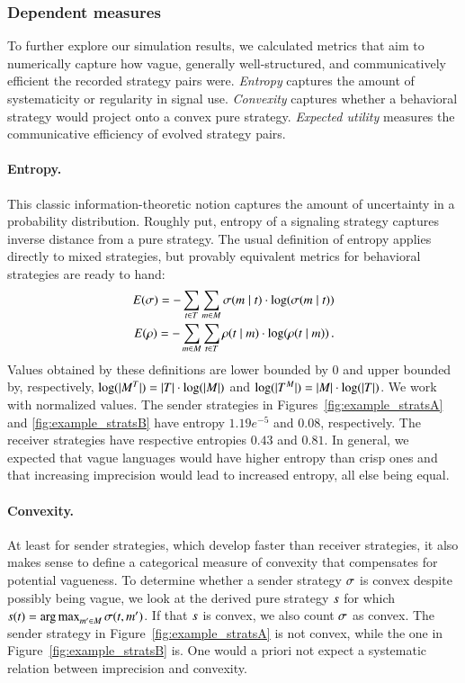 \documentclass[fleqn,reqno,10pt]{article}
\begin{document}
\subsubsection{Dependent measures}
 
To further explore our simulation results, we calculated metrics that
aim to numerically capture how vague, generally well-structured, and
communicatively efficient the recorded strategy pairs
were. \emph{Entropy} captures the amount of systematicity or
regularity in signal use. \emph{Convexity} captures whether a
behavioral strategy would project onto a convex pure
strategy. \emph{Expected utility} measures the communicative
efficiency of evolved strategy pairs.

\paragraph{Entropy.} This classic information-theoretic notion
captures the amount of uncertainty in a probability
distribution. Roughly put, entropy of a signaling strategy captures
inverse distance from a pure strategy. The usual definition of entropy
applies directly to mixed strategies, but provably equivalent metrics
for behavioral strategies are ready to hand:
\begin{align*}
  E(\sigma) = -\sum_{t \in T} \sum_{m \in M}
  \sigma(m \mid t) \cdot \log(\sigma(m \mid
  t)) \\
  E(\rho) = -\sum_{m \in M} \sum_{t \in T}
  \rho(t \mid m) \cdot \log(\rho(t \mid
  m)) \,. 
\end{align*}
Values obtained by these definitions are lower bounded by $0$ and
upper bounded by, respectively, $\log(|M^T|) = |T|
\cdot \log(|M|)$ and $\log(|T^M|) = |M| \cdot
\log(|T|)$. We work with normalized values. The sender
strategies in Figures~\ref{fig:example_stratsA} and
\ref{fig:example_stratsB} have entropy $1.19e^{-5}$ and $0.08$,
respectively. The receiver strategies have respective entropies $0.43$
and $0.81$. In general, we expected that vague languages would have
higher entropy than crisp ones and that increasing imprecision would
lead to increased entropy, all else being equal.

\paragraph{Convexity.} At least for sender strategies, which develop
faster than receiver strategies, it also makes sense to define a
categorical measure of convexity that compensates for potential
vagueness. To determine whether a sender strategy $\sigma$ is convex
despite possibly being vague, we look at the derived pure strategy
$s$ for which $s(t) = \operatorname*{arg\,max}_{m' \in M}
\sigma(t,m')$. If that $s$ is convex, we also count
$\sigma$ as convex. The sender strategy in
Figure~\ref{fig:example_stratsA} is not convex, while the one in
Figure~\ref{fig:example_stratsB} is.  One would a priori not expect a
systematic relation between imprecision and convexity.
\end{document}
